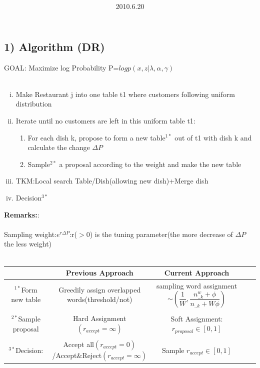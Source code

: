 \documentclass{article}
\title{\vspace{0.3in}\textmd{\textbf{\hmwkTitle}}}
\date{2010.6.20}
\author{\textbf{\hmwkAuthorName}}
\begin{document}
\begin{spacing}{1.1}
\maketitle


\section{1) Algorithm (DR)}
GOAL: Maximize log Probability P=$log p(x,z|\lambda,\alpha,\gamma)$ \\ \\
\begin{enumerate}[(i)]
\item Make Restaurant j into one table t1 where customers following uniform distribution
\item Iterate until no customers are left in this uniform table t1:
\begin{enumerate}
\item For each dish k, propose to form a new table$^{1*}$ out of t1 with dish k and calculate the change $\Delta P$
\item Sample$^{2*}$ a proposal according to the weight and make the new table
\end{enumerate}
\item TKM:Local search Table/Dish(allowing new dish)+Merge dish
\item Decision$^{3*}$
\end{enumerate}

{\bf Remarks:}:\\ \\
Sampling weight:$e^{r\Delta P}$:r($>$0) is the tuning parameter(the more decrease of $\Delta P$ the less weight)\\ \\
\begin{tabular}{|c|ccc|r|}
	\hline
  &  Previous Approach   & Current Approach   \\
	\hline
$^{1*}$Form new table &Greedily assign overlapped words(threshold/not) & sampling word assignment$\sim (\dfrac{1}{W},\dfrac{n_{..k}^{w}+\phi}{n_{..k}+W\phi})$ \\ \\
$^{2*}$Sample proposal & Hard Assignment $(r_{accept}=\infty)$ & Soft Assignment:$r_{proposal}\in [0,1]$ \\ \\
$^{3*}$Decision:  & Accept all$(r_{accept}=0)$/Accept$\&$Reject$(r_{accept}=\infty)$ & Sample $r_{accept}\in [0,1]$ \\
	\hline
\end{tabular}



\end{spacing}
\end{document}
